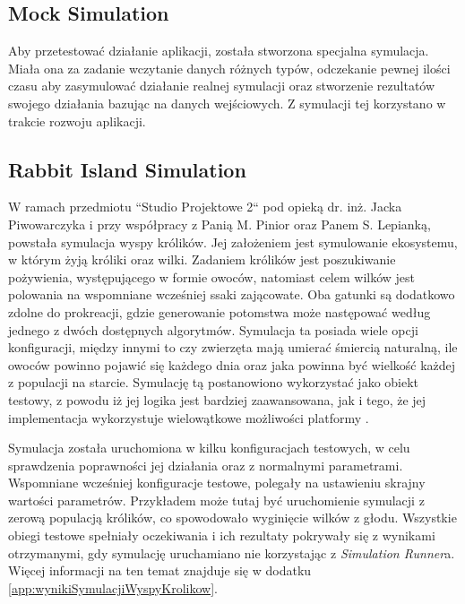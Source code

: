 \subsection{Mock Simulation}

\par Aby przetestować działanie aplikacji, została stworzona specjalna symulacja. Miała ona za zadanie wczytanie danych różnych typów, odczekanie pewnej ilości czasu aby zasymulować działanie realnej symulacji oraz stworzenie rezultatów swojego działania bazując na danych wejściowych. Z symulacji tej korzystano w trakcie rozwoju aplikacji.

\subsection{Rabbit Island Simulation}
\label{subsec:rabbitIslandSimulation}

\par W ramach przedmiotu ``Studio Projektowe 2`` pod opieką dr. inż. Jacka Piwowarczyka i przy współpracy z Panią M. Pinior oraz Panem S. Lepianką, powstała symulacja wyspy królików. Jej założeniem jest symulowanie ekosystemu, w którym żyją króliki oraz wilki. Zadaniem królików jest poszukiwanie pożywienia, występującego w formie owoców, natomiast celem wilków jest polowania na wspomniane wcześniej ssaki zającowate. Oba gatunki są dodatkowo zdolne do prokreacji, gdzie generowanie potomstwa może następować według jednego z dwóch dostępnych algorytmów. Symulacja ta posiada wiele opcji konfiguracji, między innymi to czy zwierzęta mają umierać śmiercią naturalną, ile owoców powinno pojawić się każdego dnia oraz jaka powinna być wielkość każdej z populacji na starcie. Symulację tą postanowiono wykorzystać jako obiekt testowy, z powodu iż jej logika jest bardziej zaawansowana, jak i tego, że jej implementacja wykorzystuje wielowątkowe możliwości platformy \emph{\dotnet{}}.

\par Symulacja została uruchomiona w kilku konfiguracjach testowych, w celu sprawdzenia poprawności jej działania oraz z normalnymi parametrami. Wspomniane wcześniej konfiguracje testowe, polegały na ustawieniu skrajny wartości parametrów. Przykładem może tutaj być uruchomienie symulacji z zerową populacją królików, co spowodowało wyginięcie wilków z głodu. Wszystkie obiegi testowe spełniały oczekiwania i ich rezultaty pokrywały się z wynikami otrzymanymi, gdy symulację uruchamiano nie korzystając z \emph{Simulation Runner}a. Więcej informacji na ten temat znajduje się w dodatku \ref{app:wynikiSymulacjiWyspyKrolikow}.